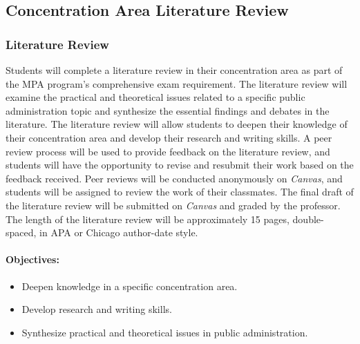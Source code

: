 \documentclass[12pt, letterpaper]{article}
\begin{document}
\subsection*{Concentration Area Literature Review}

\subsubsection*{Literature Review}

Students will complete a literature review in their concentration area as part of the MPA program's comprehensive exam requirement. The literature review will examine the practical and theoretical issues related to a specific public administration topic and synthesize the essential findings and debates in the literature. The literature review will allow students to deepen their knowledge of their concentration area and develop their research and writing skills. A peer review process will be used to provide feedback on the literature review, and students will have the opportunity to revise and resubmit their work based on the feedback received. Peer reviews will be conducted anonymously on \emph{Canvas}, and students will be assigned to review the work of their classmates. The final draft of the literature review will be submitted on \emph{Canvas} and graded by the professor. The length of the literature review will be approximately 15 pages, double-spaced, in APA or Chicago author-date style.

\paragraph*{Objectives:}
\begin{itemize}
    \item Deepen knowledge in a specific concentration area.
    \item Develop research and writing skills.
    \item Synthesize practical and theoretical issues in public administration.
\end{itemize}
\end{document}
